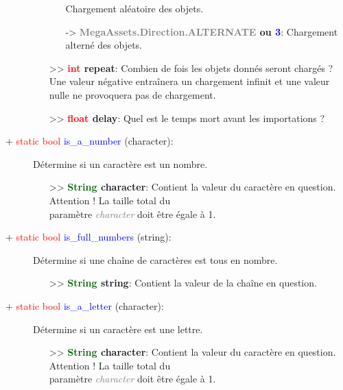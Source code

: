 \documentclass[a4paper, 11pt]{article}
\begin{document}
\begin{description}
\begin{itemize}
\begin{itemize}
				Chargement aléatoire des objets.
				\item [-> \textbf{\textcolor{gray}{MegaAssets.Direction.ALTERNATE} ou \textcolor{blue}{3}}:] 
				Chargement alterné des objets.
			\end{itemize}
			\item [>> \textbf{\textcolor{red}{int} repeat}:] Combien de fois les objets donnés seront 
			chargés ? Une valeur négative entraînera un chargement infinit et une valeur nulle ne provoquera
			pas de chargement.
			\item [>> \textbf{\textcolor{red}{float} delay}:] Quel est le temps mort avant les importations 
			?\\
		\end{itemize}
	\end{description}
	\begin{description}
		\item [+ \textcolor{red}{static bool} \textcolor{blue}{is\_a\_number} (character):] Détermine si un 
		caractère est un nombre.
		\begin{itemize}
			\item [>> \textbf{\textcolor{darkgreen}{String} character}:] Contient la valeur du caractère en 
			question. Attention ! La taille total du \\paramètre \textit{\textcolor{gray}{character}} doit 
			être égale à 1.\\
		\end{itemize}
	\end{description}
	\begin{description}
		\item [+ \textcolor{red}{static bool} \textcolor{blue}{is\_full\_numbers} (string):] Détermine si 
		une chaîne de caractères est tous en nombre.
		\begin{itemize}
			\item [>> \textbf{\textcolor{darkgreen}{String} string}:] Contient la valeur de la chaîne en 
			question.\\
		\end{itemize}
	\end{description}
	\begin{description}
		\item [+ \textcolor{red}{static bool} \textcolor{blue}{is\_a\_letter} (character):] Détermine si un 
		caractère est une lettre.
		\begin{itemize}
			\item [>> \textbf{\textcolor{darkgreen}{String} character}:] Contient la valeur du caractère en 
			question. Attention ! La taille total du \\paramètre \textit{\textcolor{gray}{character}} doit 
			être égale à 1.\\
		\end{itemize}
	\end{description}
\end{document}
